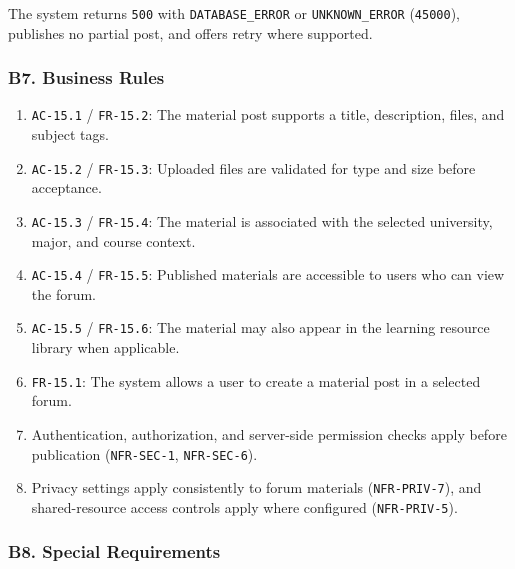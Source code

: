 \documentclass[12pt]{article}
\begin{document}
The system returns \texttt{500} with \texttt{DATABASE\_ERROR} or \texttt{UNKNOWN\_ERROR} (\texttt{45000}), publishes no partial post, and offers retry where supported.
\par\medskip

\hypertarget{sec:b7-business-rules}{}
\subsubsection*{B7. Business Rules}
\par\medskip

\begin{enumerate}
\item \texttt{AC-15.1} / \texttt{FR-15.2}: The material post supports a title, description, files, and subject tags.
\item \texttt{AC-15.2} / \texttt{FR-15.3}: Uploaded files are validated for type and size before acceptance.
\item \texttt{AC-15.3} / \texttt{FR-15.4}: The material is associated with the selected university, major, and course context.
\item \texttt{AC-15.4} / \texttt{FR-15.5}: Published materials are accessible to users who can view the forum.
\item \texttt{AC-15.5} / \texttt{FR-15.6}: The material may also appear in the learning resource library when applicable.
\item \texttt{FR-15.1}: The system allows a user to create a material post in a selected forum.
\item Authentication, authorization, and server-side permission checks apply before publication (\texttt{NFR-SEC-1}, \texttt{NFR-SEC-6}).
\item Privacy settings apply consistently to forum materials (\texttt{NFR-PRIV-7}), and shared-resource access controls apply where configured (\texttt{NFR-PRIV-5}).
\end{enumerate}
\par\medskip

\hypertarget{sec:b8-special-requirements}{}
\subsubsection*{B8. Special Requirements}
\par\medskip
\end{document}
